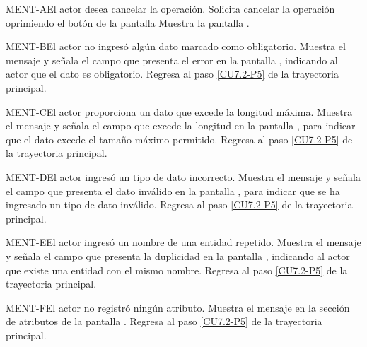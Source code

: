 	\begin{UCtrayectoriaA}{MENT-A}{El actor desea cancelar la operación.}
		\UCpaso[\UCactor] Solicita cancelar la operación oprimiendo el botón  de la pantalla 
		\UCpaso[\UCsist] Muestra la pantalla .
	\end{UCtrayectoriaA}

	\begin{UCtrayectoriaA}{MENT-B}{El actor no ingresó algún dato marcado como obligatorio.}
		\UCpaso[\UCsist] Muestra el mensaje  y señala el campo que presenta el error en la pantalla , indicando al actor que el dato es obligatorio.
		\UCpaso Regresa al paso \ref{CU7.2-P5} de la trayectoria principal.
	\end{UCtrayectoriaA}

	\begin{UCtrayectoriaA}{MENT-C}{El actor proporciona un dato que excede la longitud máxima.}
		\UCpaso[\UCsist] Muestra el mensaje  y señala el campo que excede la longitud en la pantalla , para indicar que el dato excede el tamaño máximo permitido.
		\UCpaso Regresa al paso \ref{CU7.2-P5} de la trayectoria principal.
	\end{UCtrayectoriaA}

	\begin{UCtrayectoriaA}{MENT-D}{El actor ingresó un tipo de dato incorrecto.}
		\UCpaso[\UCsist] Muestra el mensaje  y señala el campo que presenta el dato inválido en la pantalla , para indicar que se ha ingresado un tipo de dato inválido.
		\UCpaso Regresa al paso \ref{CU7.2-P5} de la trayectoria principal.
	\end{UCtrayectoriaA}
	
	\begin{UCtrayectoriaA}{MENT-E}{El actor ingresó un nombre de una entidad repetido.}
		\UCpaso[\UCsist] Muestra el mensaje  y señala el campo que presenta la duplicidad en la pantalla , indicando al actor que existe una entidad con el mismo nombre.
		\UCpaso Regresa al paso \ref{CU7.2-P5} de la trayectoria principal.
	\end{UCtrayectoriaA}

	\begin{UCtrayectoriaA}{MENT-F}{El actor no registró ningún atributo.}
	\UCpaso[\UCsist] Muestra el mensaje  en la sección de atributos de la pantalla .
	\UCpaso Regresa al paso \ref{CU7.2-P5} de la trayectoria principal.
	\end{UCtrayectoriaA}


